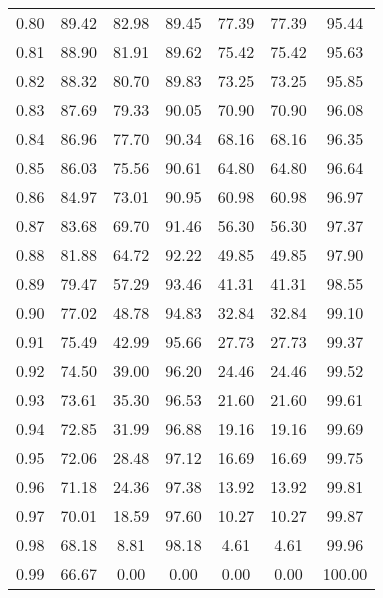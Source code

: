 \begin{tabular}{|c|c|c|c|c|c|c|}
      0.80 &     89.42 &     82.98 &      89.45 &   77.39 &      77.39 &         95.44 \\
      0.81 &     88.90 &     81.91 &      89.62 &   75.42 &      75.42 &         95.63 \\
      0.82 &     88.32 &     80.70 &      89.83 &   73.25 &      73.25 &         95.85 \\
      0.83 &     87.69 &     79.33 &      90.05 &   70.90 &      70.90 &         96.08 \\
      0.84 &     86.96 &     77.70 &      90.34 &   68.16 &      68.16 &         96.35 \\
      0.85 &     86.03 &     75.56 &      90.61 &   64.80 &      64.80 &         96.64 \\
      0.86 &     84.97 &     73.01 &      90.95 &   60.98 &      60.98 &         96.97 \\
      0.87 &     83.68 &     69.70 &      91.46 &   56.30 &      56.30 &         97.37 \\
      0.88 &     81.88 &     64.72 &      92.22 &   49.85 &      49.85 &         97.90 \\
      0.89 &     79.47 &     57.29 &      93.46 &   41.31 &      41.31 &         98.55 \\
      0.90 &     77.02 &     48.78 &      94.83 &   32.84 &      32.84 &         99.10 \\
      0.91 &     75.49 &     42.99 &      95.66 &   27.73 &      27.73 &         99.37 \\
      0.92 &     74.50 &     39.00 &      96.20 &   24.46 &      24.46 &         99.52 \\
      0.93 &     73.61 &     35.30 &      96.53 &   21.60 &      21.60 &         99.61 \\
      0.94 &     72.85 &     31.99 &      96.88 &   19.16 &      19.16 &         99.69 \\
      0.95 &     72.06 &     28.48 &      97.12 &   16.69 &      16.69 &         99.75 \\
      0.96 &     71.18 &     24.36 &      97.38 &   13.92 &      13.92 &         99.81 \\
      0.97 &     70.01 &     18.59 &      97.60 &   10.27 &      10.27 &         99.87 \\
      0.98 &     68.18 &      8.81 &      98.18 &    4.61 &       4.61 &         99.96 \\
      0.99 &     66.67 &      0.00 &       0.00 &    0.00 &       0.00 &        100.00 \\
\bottomrule
\end{tabular}
